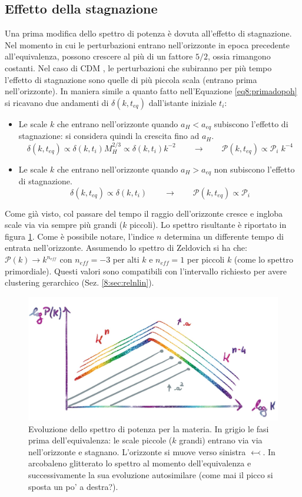 \subsection{Effetto della stagnazione}
Una prima modifica dello spettro di potenza è dovuta all'effetto di stagnazione. Nel momento in cui le perturbazioni entrano nell'orizzonte in epoca precedente all'equivalenza, possono crescere al più di un fattore $5/2$, ossia rimangono costanti. Nel caso di CDM , le perturbazioni che subiranno per più tempo l'effetto di stagnazione sono quelle di più piccola scala (entrano prima nell'orizzonte). In maniera simile a quanto fatto nell'Equazione \ref{eq8:primadopoh} si ricavano due andamenti di $\delta(k,t_{eq})$ dall'istante iniziale $t_i$:
\begin{itemize}
    \item Le scale $k$ che entrano nell'orizzonte quando $a_H <a_{eq}$ subiscono l'effetto di stagnazione: si considera quindi la crescita fino ad $a_H$. $$ \delta (k, t_{eq})\propto \delta (k, t_i) M_H^{2/3} \propto \delta (k, t_i) k^{-2}\qquad\rightarrow\qquad \mathcal{P}(k,t_{eq}) \propto \mathcal{P}_i\; k^{-4}$$
    \item Le scale $k$ che entrano nell'orizzonte quando $a_H > a_{eq}$ non subiscono l'effetto di stagnazione. $$ \delta (k, t_{eq})\propto \delta (k, t_i) \qquad\rightarrow\qquad \mathcal{P}(k,t_{eq}) \propto \mathcal{P}_i$$
\end{itemize}
Come già visto, col passare del tempo il raggio dell'orizzonte cresce e ingloba scale via via sempre più grandi ($k$ piccoli). Lo spettro risultante è riportato in figura \ref{fig8:bella}. Come è possibile notare, l'indice $n$ determina un differente tempo di entrata nell'orizzonte. Assumendo lo spettro di Zeldovich si ha che: $\mathcal{P}(k)\rightarrow k^{n_{eff}}$ con $n_{eff}=-3$ per alti $k$ e $n_{eff}=1$ per piccoli $k$ (come lo spettro primordiale). Questi valori sono compatibili con l'intervallo richiesto per avere clustering gerarchico (Sez. \ref{8:sec:relnlin}).  
\begin{figure}[H]
    \centering
    \includegraphics[width=.8 \textwidth]{Pictures/8/pertmatevolnic.jpg}
    \caption{Evoluzione dello spettro di potenza per la materia. In grigio le fasi prima dell'equivalenza: le scale piccole ($k$ grandi) entrano via via nell'orizzonte e stagnano. L'orizzonte si muove verso sinistra $\leftarrowtail $. In arcobaleno glitterato lo spettro al momento dell'equivalenza e successivamente la sua evoluzione autosimilare (come mai il picco si sposta un po' a destra?).} \label{fig8:bella} 
\end{figure}



